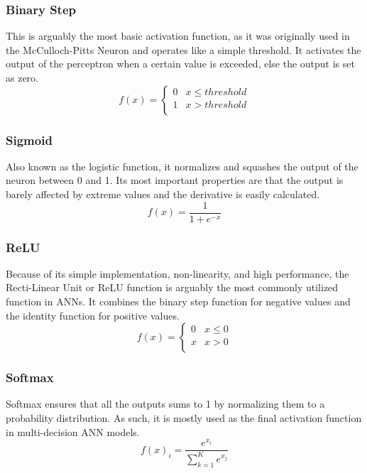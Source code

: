 \subsubsection{Binary Step}
This is arguably the most basic activation function, as it was originally used in the McCulloch-Pitts Neuron and operates like a simple threshold. It activates the output of the perceptron when a certain value is exceeded, else the output is set as zero.
\begin{equation}
	f \left( x \right) = \left\{
    	\begin{array}{ll}
    	    0 & x \leq threshold\\
    	    1 & x > threshold\\
    	\end{array} 
	\right.
	\label{eqn:Binary step}
\end{equation}

\subsubsection{Sigmoid}
Also known as the logistic function, it normalizes and squashes the output of the neuron between 0 and 1. Its most important properties are that the output is barely affected by extreme values and the derivative is easily calculated.
\begin{equation}
	f \left( x \right) = \frac{1}{1+e^{-x}}
	\label{eqn:Sigmoid}
\end{equation}

\subsubsection{ReLU}
Because of its simple implementation, non-linearity, and high performance, the Recti-Linear Unit or ReLU function is arguably the most commonly utilized function in ANNs. It combines the binary step function for negative values and the identity function for positive values.
\begin{equation}
	f \left( x \right) = \left\{
    	\begin{array}{ll}
    	    0 & x \leq 0\\
    	    x & x > 0\\
    	\end{array} 
	\right.
	\label{eqn:ReLU}
\end{equation}

\subsubsection{Softmax}
Softmax ensures that all the outputs sums to 1 by normalizing them to a probability distribution. As such, it is mostly used as the final activation function in multi-decision ANN models.
\begin{equation}
	f \left( x \right)_{i} = \frac{e^{x_i}}{\sum_{k=1}^{K}e^{x_{j}}}
	\label{eqn:Softmax}
\end{equation}

